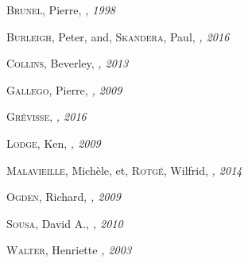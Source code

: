 \begin{thebibliography}{99}
  \textsc{Brunel}, Pierre,
  \textit{\FL, 1998}

  \textsc{Burleigh}, Peter, and, \textsc{Skandera}, Paul,
  \textit{\bs, 2016}

  \textsc{Collins}, Beverley,
  \textit{\cpp, 2013}
  
  \textsc{Gallego}, Pierre,
  \textit{\ad, 2009}
  
  \textsc{Grévisse}, 
  \textit{\GE, 2016}
  
  \textsc{Lodge}, Ken,
  \textit{\lodge, 2009}
  
  \textsc{Malavieille}, Michèle, et, \textsc{Rotgé}, Wilfrid,
  \textit{\besch, 2014}
  
  \textsc{Ogden}, Richard,
  \textit{\ogden, 2009}

  \textsc{Sousa}, David A.,
  \textit{\HTEBL, 2010}
  
  
  \textsc{Walter}, Henriette 
  \textit{\HSQMYP, 2003}
  
\end{thebibliography}